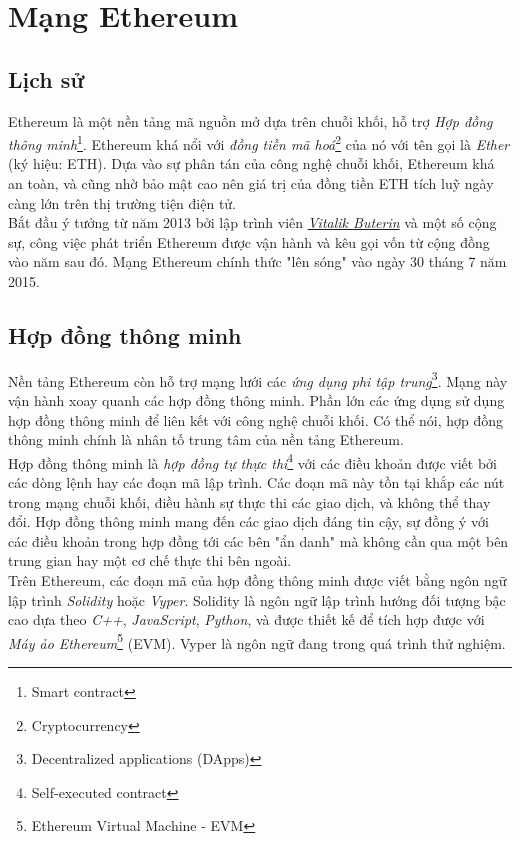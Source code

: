 \section{Mạng Ethereum}

\subsection{Lịch sử}

Ethereum là một nền tảng mã nguồn mở dựa trên chuỗi khối, hỗ trợ \textit{Hợp đồng thông minh}\footnote{Smart contract}. Ethereum khá nổi với \textit{đồng tiền mã hoá}\footnote{Cryptocurrency} của nó với tên gọi là \textit{Ether} (ký hiệu: ETH). Dựa vào sự phân tán của công nghệ chuỗi khối, Ethereum khá an toàn, và cũng nhờ bảo mật cao nên giá trị của đồng tiền ETH tích luỹ ngày càng lớn trên thị trường tiện điện tử.\\

Bắt đầu ý tưởng từ năm 2013 bởi lập trình viên \href{https://en.wikipedia.org/wiki/Vitalik_Buterin}{\textit{Vitalik Buterin}} và một số cộng sự, công việc phát triển Ethereum được vận hành và kêu gọi vốn từ cộng đồng vào năm sau đó. Mạng Ethereum chính thức "lên sóng" vào ngày 30 tháng 7 năm 2015.\\

\subsection{Hợp đồng thông minh}

Nền tảng Ethereum còn hỗ trợ mạng lưới các \textit{ứng dụng phi tập trung}\footnote{Decentralized applications (DApps)}. Mạng này vận hành xoay quanh các hợp đồng thông minh. Phần lớn các ứng dụng sử dụng hợp đồng thông minh để liên kết với công nghệ chuỗi khối. Có thể nói, hợp đồng thông minh chính là nhân tố trung tâm của nền tảng Ethereum.\\

Hợp đồng thông minh là \textit{hợp đồng tự thực thi}\footnote{Self-executed contract} với các điều khoản được viết bởi các dòng lệnh hay các đoạn mã lập trình. Các đoạn mã này tồn tại khắp các nút trong mạng chuỗi khối, điều hành sự thực thi các giao dịch, và không thể thay đổi. Hợp đồng thông minh mang đến các giao dịch đáng tin cậy, sự đồng ý với các điều khoản trong hợp đồng tới các bên "ẩn danh" mà không cần qua một bên trung gian hay một cơ chế thực thi bên ngoài.\\

Trên Ethereum, các đoạn mã của hợp đồng thông minh được viết bằng ngôn ngữ lập trình \textit{Solidity} hoặc \textit{Vyper}. Solidity là ngôn ngữ lập trình hướng đối tượng bậc cao dựa theo \textit{C++}, \textit{JavaScript}, \textit{Python}, và được thiết kế để tích hợp được với \textit{Máy ảo Ethereum}\footnote{Ethereum Virtual Machine - EVM} (EVM). Vyper là ngôn ngữ đang trong quá trình thử nghiệm.\\

